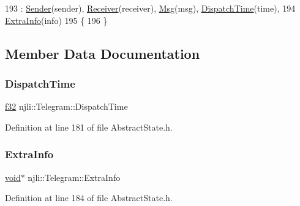 \begin{DoxyCode}
193         : \mbox{\hyperlink{classnjli_1_1_telegram_ac8d9684f9beb98cdbfb912cefb18f036}{Sender}}(sender), \mbox{\hyperlink{classnjli_1_1_telegram_aa2811ae30fb5bcbdb6dfd89bd1305b52}{Receiver}}(receiver), \mbox{\hyperlink{classnjli_1_1_telegram_a5b15d94b15ff8de3637c94f93744b26c}{Msg}}(msg), 
      \mbox{\hyperlink{classnjli_1_1_telegram_ad3624ff53bc492416a0b19f39107bfeb}{DispatchTime}}(time),
194           \mbox{\hyperlink{classnjli_1_1_telegram_a2248c08d1f6bd31106010ec55c7c0818}{ExtraInfo}}(info)
195     \{
196     \}
\end{DoxyCode}


\subsection{Member Data Documentation}
\mbox{\label{classnjli_1_1_telegram_ad3624ff53bc492416a0b19f39107bfeb}} 
\subsubsection{\texorpdfstring{Dispatch\+Time}{DispatchTime}}
{\footnotesize\ttfamily \mbox{\hyperlink{_util_8h_a5f6906312a689f27d70e9d086649d3fd}{f32}} njli\+::\+Telegram\+::\+Dispatch\+Time}



Definition at line 181 of file Abstract\+State.\+h.

\mbox{\label{classnjli_1_1_telegram_a2248c08d1f6bd31106010ec55c7c0818}} 
\subsubsection{\texorpdfstring{Extra\+Info}{ExtraInfo}}
{\footnotesize\ttfamily \mbox{\hyperlink{_thread_8h_af1e856da2e658414cb2456cb6f7ebc66}{void}}$\ast$ njli\+::\+Telegram\+::\+Extra\+Info}



Definition at line 184 of file Abstract\+State.\+h.

\mbox{\label{classnjli_1_1_telegram_a5b15d94b15ff8de3637c94f93744b26c}} 
